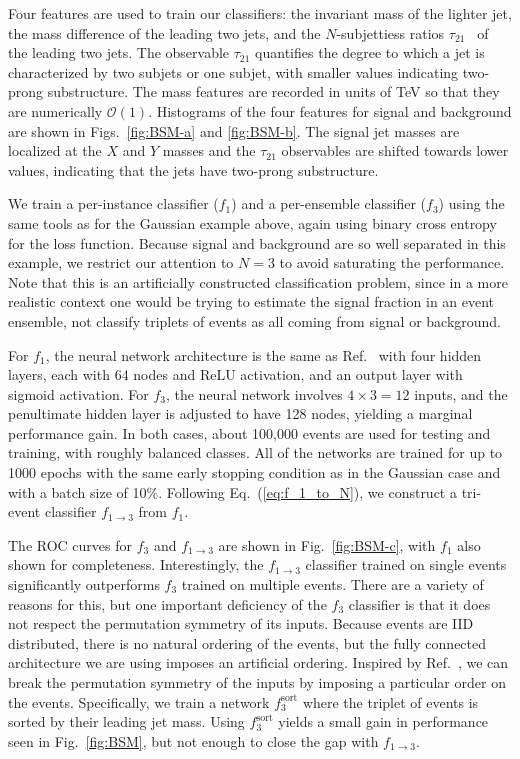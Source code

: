 \documentclass[aps,prx,reprint,preprintnumbers,superscriptaddress,nofootinbib,longbibliography,floatfix]{revtex4-2}
\DeclareRobustCommand{\Fig}[1]{Fig.~\ref{fig:#1}}
\DeclareRobustCommand{\Figs}[2]{Figs.~\ref{fig:#1} and \ref{fig:#2}}
\DeclareRobustCommand{\Eq}[1]{Eq.~(\ref{eq:#1})}
\DeclareRobustCommand{\Ref}[1]{Ref.~\cite{#1}}
\begin{document}
Four features are used to train our classifiers: the invariant mass of the lighter jet, the mass difference of the leading two jets, and the $N$-subjettiess ratios $\tau_{21}$~\cite{Thaler:2011gf,Thaler:2010tr} of the leading two jets.
%
The observable $\tau_{21}$ quantifies the degree to which a jet is characterized by two subjets or one subjet, with smaller values indicating two-prong substructure.
%
The mass features are recorded in units of TeV so that they are numerically $\mathcal{O}(1)$.
%
Histograms of the four features for signal and background are shown in \Figs{BSM-a}{BSM-b}.
%
The signal jet masses are localized at the $X$ and $Y$ masses and the $\tau_{21}$ observables are shifted towards lower values, indicating that the jets have two-prong substructure.
 
 


We train a per-instance classifier ($f_1$) and a per-ensemble classifier ($f_3$) using the same tools as for the Gaussian example above, again using binary cross entropy for the loss function.
%
Because signal and background are so well separated in this example, we restrict our attention to $N = 3$ to avoid saturating the performance.
%
Note that this is an artificially constructed classification problem, since in a more realistic context one would be trying to estimate the signal fraction in an event ensemble, not classify triplets of events as all coming from signal or background.



For $f_1$, the neural network architecture is the same as \Ref{2010.03569} with four hidden layers, each with 64 nodes and ReLU activation, and an output layer with sigmoid activation. 
%
For $f_3$, the neural network involves $4 \times 3 = 12$ inputs, and the penultimate hidden layer is adjusted to have 128 nodes, yielding a marginal performance gain. 
%
In both cases, about 100,000 events are used for testing and training, with roughly balanced classes.
%
All of the networks are trained for up to 1000 epochs with the same early stopping condition as in the Gaussian case and with a batch size of 10\%.
%
Following \Eq{f_1_to_N}, we construct a tri-event classifier $f_{1\rightarrow 3}$ from $f_1$.


The ROC curves for $f_3$ and $f_{1 \to 3}$ are shown in \Fig{BSM-c}, with $f_1$ also shown for completeness.
%
Interestingly, the $f_{1\rightarrow 3}$ classifier trained on single events significantly outperforms $f_3$ trained on multiple events.
%
There are a variety of reasons for this, but one important deficiency of the $f_3$ classifier is that it does not respect the permutation symmetry of its inputs.
%
Because events are IID distributed, there is no natural ordering of the events, but the fully connected architecture we are using imposes an artificial ordering.
%
Inspired by \Ref{Flesher:2020kuy}, we can break the permutation symmetry of the inputs by imposing a particular order on the events.
%
Specifically, we train a network $f_3^\text{sort}$ where the triplet of events is sorted by their leading jet mass.
%
Using $f_3^\text{sort}$ yields a small gain in performance seen in \Fig{BSM}, but not enough to close the gap with $f_{1\rightarrow 3}$. 
\end{document}
